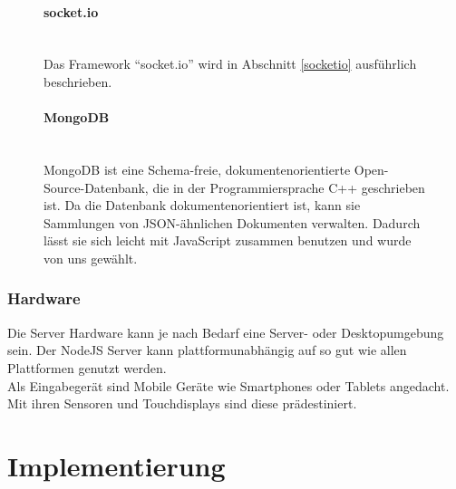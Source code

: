 \documentclass[a4paper]{spie}  %
\begin{document}
\begin{figure}[H]
\begin{minipage}[t]{0.4\textwidth}
\vspace{0pt}
\paragraph{socket.io}\mbox{}\\
Das Framework \enquote{socket.io} wird in Abschnitt \ref{socketio} ausführlich beschrieben.
\end{minipage}
\hfill
\begin{minipage}[t]{0.5\textwidth}
\vspace{0pt}
\paragraph{MongoDB}\mbox{}\\
MongoDB ist eine Schema-freie, dokumentenorientierte Open-Source-Datenbank, die in der Programmiersprache C++ geschrieben ist. Da die Datenbank dokumentenorientiert ist, kann sie Sammlungen von JSON-ähnlichen Dokumenten verwalten. Dadurch lässt sie sich leicht mit JavaScript zusammen benutzen und wurde von uns gewählt.
\end{minipage}
\end{figure}


\subsubsection{Hardware}
Die Server Hardware kann je nach Bedarf eine Server- oder Desktopumgebung sein. Der NodeJS Server kann plattformunabhängig auf so gut wie allen Plattformen genutzt werden.\\
Als Eingabegerät sind Mobile Geräte wie Smartphones oder Tablets angedacht. Mit ihren Sensoren und Touchdisplays sind diese prädestiniert.
%
%

\section{Implementierung}
\end{document}
